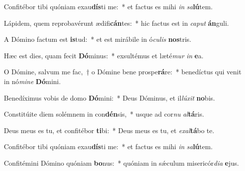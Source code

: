 \item Confitébor tibi quóniam exau\textbf{dís}ti me:~* et factus es mihi \textit{in} \textit{sa}\textbf{lú}tem.
\item Lápidem, quem reprobavérunt ædifi\textbf{cán}tes:~* hic factus est in \textit{ca}\textit{put} \textbf{án}guli.
\item A Dómino factum est \textbf{is}tud:~* et est mirábile in ó\textit{cu}\textit{lis} \textbf{nos}tris.
\item Hæc est dies, quam fecit \textbf{Dó}minus:~* exsultémus et læté\textit{mur} \textit{in} \textbf{e}a.
\item O Dómine, salvum me fac,~† o Dómine bene prospe\textbf{rá}re:~* benedíctus qui venit in nó\textit{mi}\textit{ne} \textbf{Dó}mini.
\item Benedíximus vobis de domo \textbf{Dó}mini:~* Deus Dóminus, et il\textit{lú}\textit{xit} \textbf{no}bis.
\item Constitúite diem solémnem in con\textbf{dén}sis,~* usque ad cor\textit{nu} \textit{al}\textbf{tá}ris.
\item Deus meus es tu, et confitébor \textbf{ti}bi:~* Deus meus es tu, et \textit{ex}\textit{al}\textbf{tá}bo te.
\item Confitébor tibi quóniam exau\textbf{dís}ti me:~* et factus es mihi \textit{in} \textit{sa}\textbf{lú}tem.
\item Confitémini Dómino quóniam \textbf{bo}nus:~* quóniam in sǽculum misericór\textit{di}\textit{a} \textbf{e}jus.
